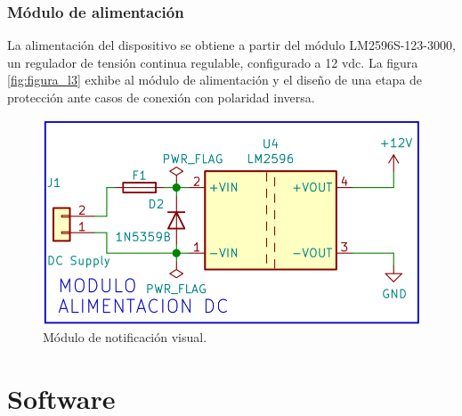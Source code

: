 \subsubsection{Módulo de alimentación}

La alimentación del dispositivo se obtiene a partir del módulo LM2596S-123-3000, un regulador de tensión continua regulable, configurado a 12 vdc. La figura \ref{fig:figura_l3} exhibe al módulo de alimentación y el diseño de una etapa de protección ante casos de conexión con polaridad inversa.

\begin{figure}[]
	\centering
	\includegraphics[scale=.25]{./Figures/Capitulo3/Fig_L3.png}
	\caption{Módulo de notificación visual.}
	\label{fig:figura_k3}
\end{figure} 


\section{Software}

